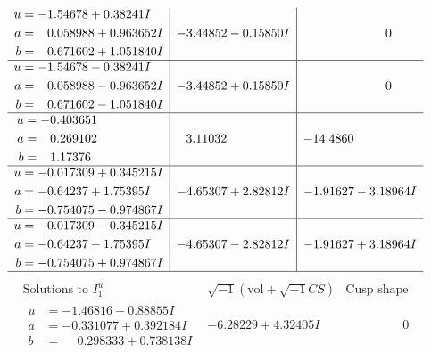 \documentclass[1p]{elsarticle_modified}
\theoremstyle{definition}
\newcommand{\I}{\sqrt{-1}}
\begin{document}
$$\begin{array}{c|c|c}
\begin{aligned}
u &= -1.54678 + 0.38241 I \\
a &= \phantom{-}0.058988 + 0.963652 I \\
b &= \phantom{-}0.671602 + 1.051840 I\end{aligned}
 & -3.44852 - 0.15850 I & \phantom{-0.000000 } 0 \\ \hline\begin{aligned}
u &= -1.54678 - 0.38241 I \\
a &= \phantom{-}0.058988 - 0.963652 I \\
b &= \phantom{-}0.671602 - 1.051840 I\end{aligned}
 & -3.44852 + 0.15850 I & \phantom{-0.000000 } 0 \\ \hline\begin{aligned}
u &= -0.403651\phantom{ +0.000000I} \\
a &= \phantom{-}0.269102\phantom{ +0.000000I} \\
b &= \phantom{-}1.17376\phantom{ +0.000000I}\end{aligned}
 & \phantom{-}3.11032\phantom{ +0.000000I} & -14.4860\phantom{ +0.000000I} \\ \hline\begin{aligned}
u &= -0.017309 + 0.345215 I \\
a &= -0.64237 + 1.75395 I \\
b &= -0.754075 - 0.974867 I\end{aligned}
 & -4.65307 + 2.82812 I & -1.91627 - 3.18964 I \\ \hline\begin{aligned}
u &= -0.017309 - 0.345215 I \\
a &= -0.64237 - 1.75395 I \\
b &= -0.754075 + 0.974867 I\end{aligned}
 & -4.65307 - 2.82812 I & -1.91627 + 3.18964 I\\
 \hline 
 \end{array}$$\newpage$$\begin{array}{c|c|c}  
\text{Solutions to }I^u_{1}& \I (\text{vol} + \sqrt{-1}CS) & \text{Cusp shape}\\
 \hline 
\begin{aligned}
u &= -1.46816 + 0.88855 I \\
a &= -0.331077 + 0.392184 I \\
b &= \phantom{-}0.298333 + 0.738138 I\end{aligned}
 & -6.28229 + 4.32405 I & \phantom{-0.000000 } 0 \\ \hline\begin{aligned}

\end{aligned}
\end{array}$$
\end{document}
